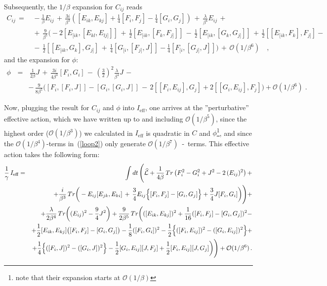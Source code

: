 \documentclass[a4paper,11pt]{article}
\begin{document}
Subsequently, the $1/\beta $ expansion for $C_{ij}$ reads
\begin{align}\label{eo1}
C_{ij}\, =&\,-\frac{1}{\beta }E_{ij}\,+\,\frac{3i}{\beta ^{3}}\left(
[E_{ik},E_{kj}]+\frac{1}{4}[F_{i},F_{j}]-\frac{1}{4}[G_{i},G_{j}]\right)
\,+\,\frac{\lambda}{\beta ^{4}}E_{ij}\,+\nonumber\\
&\,+\,\frac{9}{\beta ^{5}}\bigg(-2[E_{[ik},[E_{kl},E_{lj]}]] \,+ \,
\frac{1}{2}[E_{[ik},[F_{k},F_{j]}]]\,-\,\frac{1}{2}[E_{[ik},[G_{k},G_{j]}]]\,+\,
\frac{1}{2}[[E_{[ik},F_{k}],F_{j]}]- \nonumber\\
&\,-\,\frac{1}{2}[[E_{[ik},G_{k}],G_{j]}]\,+\,\frac{1}{4}[G_{[i},[F_{j]},J]]-
\frac{1}{4}[F_{[i},[G_{j]},J]]\bigg) \,+\,\mathcal{O}(1/\beta ^{6})\quad ,
\end{align}
and the expansion for $\phi $: 
\begin{eqnarray}\label{eo2}
\phi \, &=&\,\frac{1}{2\beta }J\,+\,\frac{3i}{4\beta ^{3}}[F_{i},G_{i}]\,-
\,\left( \frac{3}{2}\right) ^{2}\frac{\lambda}{\beta ^{4}}J\,-\,\\
&&-\,\frac{9}{8\beta ^{5}}\bigg( [F_{i},[F_{i},J]]-[G_{i},[G_{i},J]]\,- 
\,2[[F_{i},E_{ij}],G_{j}]+2[[G_{i},E_{ij}],F_{j}]\bigg) +\mathcal{
O}(1/\beta ^{6})\;.\nonumber
\end{eqnarray}

Now, plugging the result for $C_{ij}$ and $\phi $ into $I_{\text{eff}}$, one
arrives at the ''perturbative'' effective action, which we have written
up to and including $\mathcal{O}(1/\beta ^{5})$, since the highest order ($\mathcal{O}(1/\beta ^{3})$)
we calculated in $I_{\text{eff}}$ is quadratic in $C$ and $\phi$\footnote{note that their expansion starts at 
$\mathcal{O}(1/\beta)$}, and since the $\mathcal{O}(1/\beta ^{4})$-terms in~(\ref{loop2}) only generate 
$\mathcal{O}(1/\beta ^{7})$~-~terms. This effective action takes the following form:
\begin{eqnarray*}
\frac{1}{\gamma}\,I_{\text{eff}} &=&\int dt\,\Bigg( \widehat{\mathcal{L}}+
\frac{1}{4\beta}\,Tr\left(F_{i}^{2}-G_{i}^{2}+J^{2}-2\,(E_{ij})^2\right) + \\
&&+\frac{i}{\beta ^{3}}\,Tr\bigg(-E_{ij}[E_{jk},E_{ki}]\,+\,\frac{3}{4}E_{ij}\Big\{[F_{i},F_{j}]-[G_{i},G_{j}]\Big\}+
\frac{3}{4}J[F_{i},G_{i}]\bigg) \Bigg)
 +\\
&&+\frac{\lambda}{2\beta ^{4}}\,Tr\bigg((E_{ij})^2-\frac{9}{4}J^2\bigg)+
\frac{9}{2\beta ^{5}}\,Tr\bigg(([E_{ik},E_{kj}])^2 + \frac{1}{16}([F_i,F_j]-[G_i,G_j])^2-\\
&&+\frac{1}{2}[E_{ik},E_{kj}]\big([F_i,F_j]-[G_i,G_j]\big)-
\frac{1}{8}([F_i,G_i])^2-\frac{1}{2}\Big\{([F_i,E_{ij}])^2-([G_i,E_{ij}])^2\Big\}+\\
&&+\frac{1}{4}\Big\{([F_i,J])^2-([G_i,J])^2\Big\}-\frac{1}{2}[G_i,E_{ij}][J,F_j]+\frac{1}{2}[F_i,E_{ij}][J,G_j]\bigg)\Bigg)
+{\cal O}(1/\beta^6) \,.
\end{eqnarray*}
\end{document}
